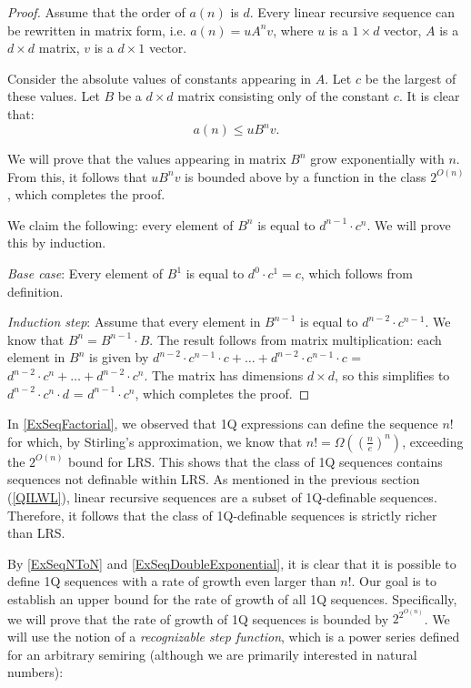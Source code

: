 \documentclass[12pt]{article}
\theoremstyle{definition}
\begin{document}
\begin{proof}
    Assume that the order of $a(n)$ is $d$. Every linear recursive sequence can be rewritten in matrix form, i.e. $a(n) = uA^nv$, where $u$ is a $1 \times d$ vector, $A$ is a $d \times d$ matrix, $v$ is a $d \times 1$ vector. 

    Consider the absolute values of constants appearing in $A$. Let $c$ be the largest of these values. Let $B$ be a $d \times d$ matrix consisting only of the constant $c$. It is clear that:
    $$a(n) \leq uB^nv.$$

    We will prove that the values appearing in matrix $B^n$ grow exponentially with $n$. From this, it follows that $uB^nv$ is bounded above by a function in the class $2^{O(n)}$, which completes the proof.

    We claim the following: every element of $B^n$ is equal to $d^{n-1} \cdot c^n$. We will prove this by induction.

    \emph{Base case}: Every element of $B^1$ is equal to $d^0 \cdot c^1 = c$, which follows from definition.

    \emph{Induction step}: Assume that every element in $B^{n-1}$ is equal to $d^{n-2} \cdot c^{n-1}$. We know that $B^n = B^{n-1} \cdot B$. The result follows from matrix multiplication: each element in $B^n$ is given by $d^{n-2} \cdot c^{n-1} \cdot c + \ldots + d^{n-2} \cdot c^{n-1} \cdot c$ = $d^{n-2} \cdot c^n + \ldots + d^{n-2} \cdot c^n$. The matrix has dimensions $d \times d$, so this simplifies to $d^{n-2} \cdot c^n \cdot d$ = $d^{n-1} \cdot c^n$, which completes the proof.
\end{proof}

In \cref{ExSeqFactorial}, we observed that 1Q expressions can define the sequence $n!$ for which, by Stirling's approximation, we know that $n! = \Omega((\frac{n}{e})^n)$, exceeding the $2^{O(n)}$ bound for LRS. This shows that the class of 1Q sequences contains sequences not definable within LRS. As mentioned in the previous section (\ref{QILWL}), linear recursive sequences are a subset of 1Q-definable sequences. Therefore, it follows that the class of 1Q-definable sequences is strictly richer than LRS.

By \cref{ExSeqNToN} and \cref{ExSeqDoubleExponential}, it is clear that it is possible to define 1Q sequences with a rate of growth even larger than $n!$. Our goal is to establish an upper bound for the rate of growth of all 1Q sequences. Specifically, we will prove that the rate of growth of 1Q sequences is bounded by $2^{2^{O(n)}}$. We will use the notion of a \emph{recognizable step function}, which is a power series defined for an arbitrary semiring (although we are primarily interested in natural numbers):
\end{document}

